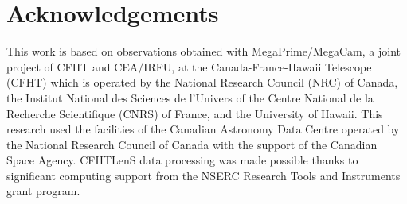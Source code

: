 \documentclass[useAMS,usenatbib,a4paper]{mn2e}
\begin{document}
\twocolumn


\section*{Acknowledgements}
 

This work is based on observations obtained with MegaPrime/MegaCam, a joint
project of CFHT and CEA/IRFU, at the Canada-France-Hawaii Telescope (CFHT) which
is operated by the National Research Council (NRC) of Canada, the Institut
National des Sciences de l'Univers of the Centre National de la Recherche
Scientifique (CNRS) of France, and the University of Hawaii. This research used
the facilities of the Canadian Astronomy Data Centre operated by the National
Research Council of Canada with the support of the Canadian Space Agency.
CFHTLenS data processing was made possible thanks to significant computing
support from the NSERC Research Tools and Instruments grant program.


\appendix




% 



%



\label{lastpage}
\bsp
\end{document}
